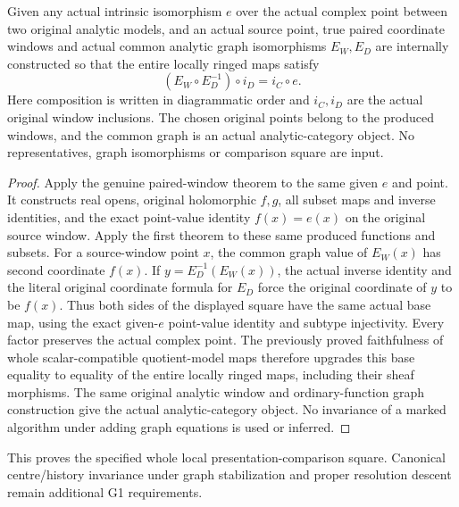 \begin{theorem}
\label{hir:actual-intrinsic-iso-whole-common-graph-square}
\leanok
Given any actual intrinsic isomorphism $e$ over the actual complex point
between two original analytic models, and an actual source point, true
paired coordinate windows and actual common analytic graph isomorphisms
$E_W,E_D$ are internally constructed so that the entire locally ringed
maps satisfy
\[
 (E_W\circ E_D^{-1})\circ i_D=i_C\circ e.
\]
Here composition is written in diagrammatic order and $i_C,i_D$ are the
actual original window inclusions. The chosen original points belong to
the produced windows, and the common graph is an actual analytic-category
object. No representatives, graph isomorphisms or comparison square are input.
\end{theorem}
\begin{proof}
Apply the genuine paired-window theorem to the same given $e$ and point.
It constructs real opens, original holomorphic $f,g$, all subset maps and
inverse identities, and the exact point-value identity $f(x)=e(x)$ on
the original source window. Apply the first theorem to these same produced
functions and subsets. For a source-window point $x$, the common graph
value of $E_W(x)$ has second coordinate $f(x)$. If
$y=E_D^{-1}(E_W(x))$, the actual inverse identity and the literal original
coordinate formula for $E_D$ force the original coordinate of $y$ to be
$f(x)$. Thus both sides of the displayed square have the same actual base
map, using the exact given-$e$ point-value identity and subtype injectivity.
Every factor preserves the actual complex point. The previously proved
faithfulness of whole scalar-compatible quotient-model maps therefore
upgrades this base equality to equality of the entire locally ringed maps,
including their sheaf morphisms. The same original analytic window and
ordinary-function graph construction give the actual analytic-category
object. No invariance of a marked algorithm under adding graph equations
is used or inferred.
\end{proof}

This proves the specified whole local presentation-comparison square.
Canonical centre/history invariance under graph stabilization and proper
resolution descent remain additional G1 requirements.
